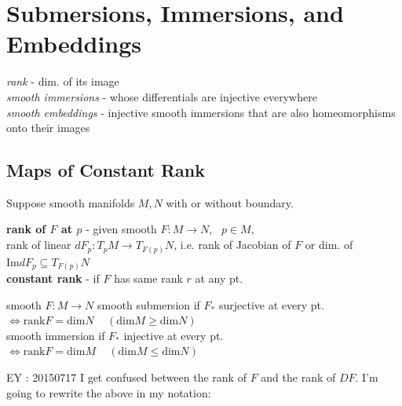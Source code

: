 \section{Submersions, Immersions, and Embeddings}




\emph{rank} - dim. of its image \\

\emph{smooth immersions} - whose differentials are injective everywhere \\
\emph{smooth embeddings} - injective smooth immersions that are also homeomorphisms onto their images 

\subsection*{Maps of Constant Rank}

Suppose smooth manifolds $M,N$ with or without boundary.  


\textbf{rank of $F$ at $p$ } - given smooth $F: M \to N$, \, $p\in M$, \\
\quad rank of linear $dF_p : T_pM \to T_{F(p)}N$, i.e. rank of Jacobian of $F$ or dim. of $\text{Im}{ dF_p} \subseteq T_{F(p)}N$ \\
\textbf{constant rank } - if $F$ has same rank $r$ at any pt. 

smooth $F:M \to N$ smooth submersion if $F_*$ surjective at every pt.  $\Longleftrightarrow \text{rank}{F} = \text{dim}{N} \quad \, (\text{dim}{M} \geq \text{dim}{N})$ \\
\phantom{smooth $F:M \to N$} smooth immersion if $F_*$ injective at every pt. $\Longleftrightarrow \text{rank}{F} = \text{dim}{M} \quad \, (\text{dim}{M} \leq \text{dim}{N})$


EY : 20150717 I get confused between the rank of $F$ and the rank of $DF$.  I'm going to rewrite the above in my notation:


 \quad \quad \quad \, 

